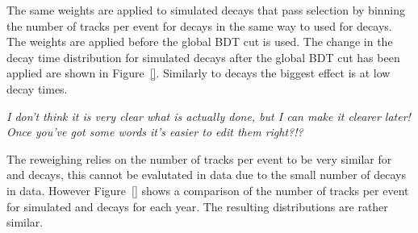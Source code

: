 The same weights are applied to simulated \bsmumu decays that pass selection by binning the number of tracks per event for \bsmumu decays in the same way to used for \bdkpi decays. The weights are applied before the global BDT cut is used. The change in the decay time distribution for \bsmuu simulated decays after the global BDT cut has been applied are shown in Figure~\ref{}. Similarly to \bdkpi decays the biggest effect is at low decay times.

{\it I don't think it is very clear what is actually done, but I can make it clearer later! Once you've got some words it's easier to edit them right?!?}

The reweighing relies on the number of tracks per event to be very similar for \bdkpi and \bsmumu decays, this cannot be evalutated in data due to the small number of \bsmumu decays in data. However Figure~\ref{} shows a comparison of the number of tracks per event for simulated \bsmumu and \bdkpi decays for each year. The resulting distributions are rather similar.

